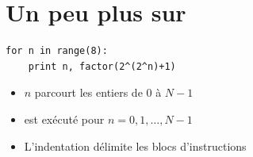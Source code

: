 \section{Un peu plus sur \Sage}

\begin{frame}[fragile]


\medskip

\pause
\begin{algo}
\begin{lstlisting}
for n in range(8):
    print n, factor(2^(2^n)+1)
\end{lstlisting}
\end{algo}

\pause
\begin{itemize}
  \item {} 
  
  $n$ parcourt les entiers de $0$ à   $N-1$
  
  \medskip 
  \pause 
  
  \item {}
  
  est exécuté pour $n=0,1,\ldots,N-1$
  
  \medskip
  \pause
 \item L'indentation délimite les blocs d'instructions
\end{itemize}

\end{frame}




